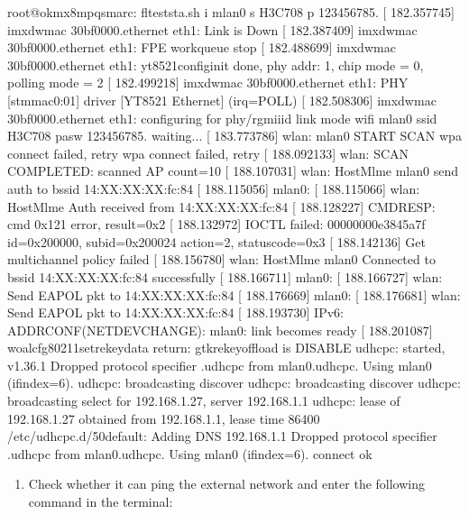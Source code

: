 \documentclass[letterpaper,10pt,openany,english]{sphinxmanual}
\begin{document}
\begin{sphinxVerbatim}[commandchars=\\\{\}]
root@ok\PYGZhy{}mx8mpq\PYGZhy{}smarc:\PYGZti{}\PYGZsh{} fltest\PYGZus{}sta.sh \PYGZhy{}i mlan0 \PYGZhy{}s H3C\PYGZus{}708 \PYGZhy{}p 123456785.
[  182.357745] imx\PYGZhy{}dwmac 30bf0000.ethernet eth1: Link is Down
[  182.387409] imx\PYGZhy{}dwmac 30bf0000.ethernet eth1: FPE workqueue stop
[  182.488699] imx\PYGZhy{}dwmac 30bf0000.ethernet eth1: yt8521\PYGZus{}config\PYGZus{}init done, phy addr: 1, chip mode = 0, polling mode = 2
[  182.499218] imx\PYGZhy{}dwmac 30bf0000.ethernet eth1: PHY [stmmac\PYGZhy{}0:01] driver [YT8521 Ethernet] (irq=POLL)
[  182.508306] imx\PYGZhy{}dwmac 30bf0000.ethernet eth1: configuring for phy/rgmii\PYGZhy{}id link mode
wifi mlan0
ssid H3C\PYGZus{}708
pasw 123456785.
waiting...
[  183.773786] wlan: mlan0 START SCAN
wpa connect failed, retry
wpa connect failed, retry
[  188.092133] wlan: SCAN COMPLETED: scanned AP count=10
[  188.107031] wlan: HostMlme mlan0 send auth to bssid 14:XX:XX:XX:fc:84
[  188.115056] mlan0: 
[  188.115066] wlan: HostMlme Auth received from 14:XX:XX:XX:fc:84
[  188.128227] CMD\PYGZus{}RESP: cmd 0x121 error, result=0x2
[  188.132972] IOCTL failed: 00000000e3845a7f id=0x200000, sub\PYGZus{}id=0x200024 action=2, status\PYGZus{}code=0x3
[  188.142136] Get multi\PYGZhy{}channel policy failed
[  188.156780] wlan: HostMlme mlan0 Connected to bssid 14:XX:XX:XX:fc:84 successfully
[  188.166711] mlan0: 
[  188.166727] wlan: Send EAPOL pkt to 14:XX:XX:XX:fc:84
[  188.176669] mlan0: 
[  188.176681] wlan: Send EAPOL pkt to 14:XX:XX:XX:fc:84
[  188.193730] IPv6: ADDRCONF(NETDEV\PYGZus{}CHANGE): mlan0: link becomes ready
[  188.201087] woal\PYGZus{}cfg80211\PYGZus{}set\PYGZus{}rekey\PYGZus{}data return: gtk\PYGZus{}rekey\PYGZus{}offload is DISABLE
udhcpc: started, v1.36.1
Dropped protocol specifier \PYGZsq{}.udhcpc\PYGZsq{} from \PYGZsq{}mlan0.udhcpc\PYGZsq{}. Using \PYGZsq{}mlan0\PYGZsq{} (ifindex=6).
udhcpc: broadcasting discover
udhcpc: broadcasting discover
udhcpc: broadcasting select for 192.168.1.27, server 192.168.1.1
udhcpc: lease of 192.168.1.27 obtained from 192.168.1.1, lease time 86400
/etc/udhcpc.d/50default: Adding DNS 192.168.1.1
Dropped protocol specifier \PYGZsq{}.udhcpc\PYGZsq{} from \PYGZsq{}mlan0.udhcpc\PYGZsq{}. Using \PYGZsq{}mlan0\PYGZsq{} (ifindex=6).
connect ok
\end{sphinxVerbatim}
\begin{enumerate}
%
\setcounter{enumi}{1}
\item {} 
\sphinxAtStartPar
Check whether it can ping the external network and enter the following command in the terminal:

\end{enumerate}
\end{document}
